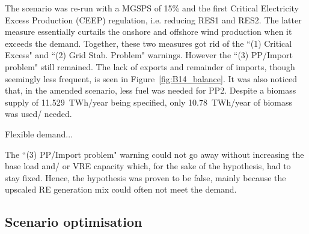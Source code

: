 The scenario was re-run with a MGSPS of 15\% and the first Critical Electricity Excess Production (CEEP) regulation, i.e. reducing RES1 and RES2.
The latter measure essentially curtails the onshore and offshore wind production when it exceeds the demand.
Together, these two measures got rid of the ``(1) Critical Excess" and ``(2) Grid Stab. Problem" warnings.
However the ``(3) PP/Import problem" still remained.
The lack of exports and remainder of imports, though seemingly less frequent, is seen in Figure~\ref{fig:B14_balance}.
It was also noticed that, in the amended scenario, less fuel was needed for PP2.
Despite a biomass supply of 11.529~TWh/year being specified, only 10.78~TWh/year of biomass was used/ needed.



Flexible demand...

The ``(3) PP/Import problem" warning could not go away without increasing the base load and/ or VRE capacity which, for the sake of the hypothesis, had to stay fixed.
Hence, the hypothesis was proven to be false, mainly because the upscaled RE generation mix could often not meet the demand.




\subsection{Scenario optimisation}


